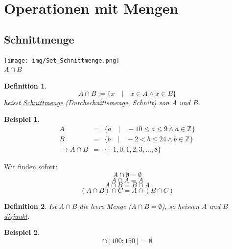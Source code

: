 \documentclass{report}
\newtheorem{mydef}{Definition}
\newtheorem{myexample}{Beispiel}
\begin{document}
\section{Operationen mit Mengen}
\subsection{Schnittmenge}
\begin{center}\texttt{[image: img/Set\_Schnittmenge.png]}\\$A \cap B$\end{center}
\begin{mydef}\begin{equation}A \cap B := \{x \quad | \quad x \in A \land x \in B \}\end{equation}
heisst \underline{Schnittmenge} (Durchschnittsmenge, Schnitt) von $A$ und $B$.\end{mydef}
\begin{myexample}\begin{eqnarray}A & = & \{a \quad | \quad -10 \leq a \leq 9 \land a \in \mathbb{Z}\}\nonumber \\
B & = & \{b \quad | \quad -2 < b \leq 24 \land b \in \mathbb{Z}\} \nonumber \\
\to A \cap B & = & \{-1, 0, 1, 2, 3, ..., 8\}\end{eqnarray}\end{myexample}
Wir finden sofort:
\begin{equation}A \cap \emptyset = \emptyset\end{equation}
\begin{equation}A \cap A = A\end{equation}
\begin{equation}A \cap B = B \cap A\end{equation}
\begin{equation}(A \cap B) \cap C = A \cap (B \cap C)\end{equation}
\begin{mydef}Ist $A \cap B$ die leere Menge ($A \cap B = \emptyset$), so heissen $A$ und $B$ \underline{disjunkt}.\end{mydef}
\begin{myexample}\begin{equation}[4 ; 10] \cap [100 ; 150] = \emptyset\end{equation}\end{myexample}
\end{document}
